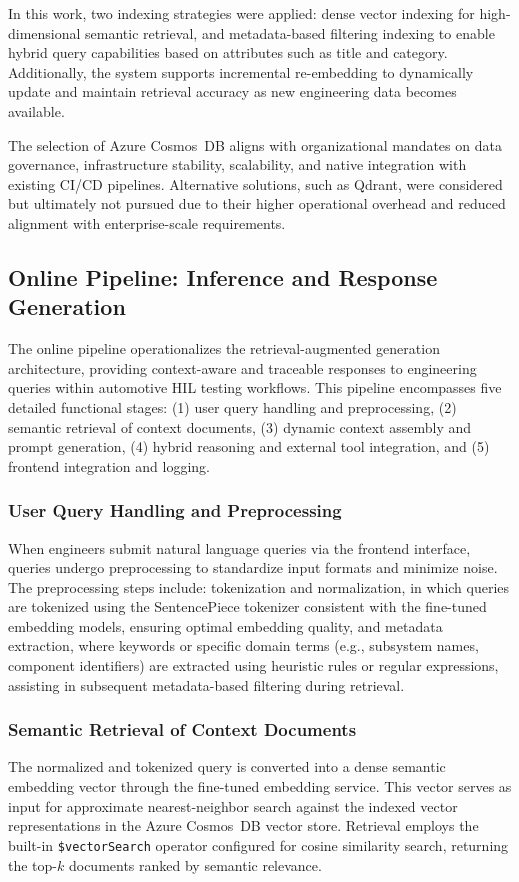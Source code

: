 \documentclass[a4paper,fleqn]{cas-dc}
\renewcommand{\textit}[1]{#1}
\begin{document}
In this work, two indexing strategies were applied: \textit{dense vector indexing} for high-dimensional semantic retrieval, and \textit{metadata-based filtering indexing} to enable hybrid query capabilities based on attributes such as title and category. Additionally, the system supports incremental re-embedding to dynamically update and maintain retrieval accuracy as new engineering data becomes available.

The selection of Azure Cosmos~DB aligns with organizational mandates on data governance, infrastructure stability, scalability, and native integration with existing CI/CD pipelines. Alternative solutions, such as Qdrant, were considered but ultimately not pursued due to their higher operational overhead and reduced alignment with enterprise-scale requirements.

\subsection{Online Pipeline: Inference and Response Generation}
\label{sec:online-pipeline}

The online pipeline operationalizes the retrieval-augmented generation architecture, providing context-aware and traceable responses to engineering queries within automotive HIL testing workflows. This pipeline encompasses five detailed functional stages: (1) user query handling and preprocessing, (2) semantic retrieval of context documents, (3) dynamic context assembly and prompt generation, (4) hybrid reasoning and external tool integration, and (5) frontend integration and logging.

\subsubsection{User Query Handling and Preprocessing}
When engineers submit natural language queries via the frontend interface, queries undergo preprocessing to standardize input formats and minimize noise. The preprocessing steps include:
\textit{tokenization and normalization}, in which queries are tokenized using the SentencePiece tokenizer consistent with the fine-tuned embedding models, ensuring optimal embedding quality, and \textit{metadata extraction}, where keywords or specific domain terms (e.g., subsystem names, component identifiers) are extracted using heuristic rules or regular expressions, assisting in subsequent metadata-based filtering during retrieval.

\subsubsection{Semantic Retrieval of Context Documents}
The normalized and tokenized query is converted into a dense semantic embedding vector through the fine-tuned embedding service. This vector serves as input for approximate nearest-neighbor search against the indexed vector representations in the Azure Cosmos~DB vector store. Retrieval employs the built-in \texttt{\$vectorSearch} operator configured for cosine similarity search, returning the top-$k$ documents ranked by semantic relevance. 
\end{document}
